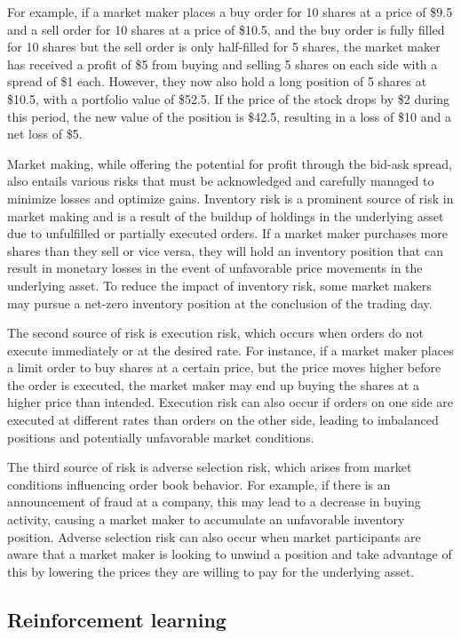 \documentclass[
  12pt,
  a4paper,
  DIV=11,
  numbers=noendperiod]{scrartcl}
\begin{document}
For example, if a market maker places a buy order for 10 shares at a
price of \$9.5 and a sell order for 10 shares at a price of \$10.5, and
the buy order is fully filled for 10 shares but the sell order is only
half-filled for 5 shares, the market maker has received a profit of \$5
from buying and selling 5 shares on each side with a spread of \$1 each.
However, they now also hold a long position of 5 shares at \$10.5, with
a portfolio value of \$52.5. If the price of the stock drops by \$2
during this period, the new value of the position is \$42.5, resulting
in a loss of \$10 and a net loss of \$5.

Market making, while offering the potential for profit through the
bid-ask spread, also entails various risks that must be acknowledged and
carefully managed to minimize losses and optimize gains. Inventory risk
is a prominent source of risk in market making and is a result of the
buildup of holdings in the underlying asset due to unfulfilled or
partially executed orders. If a market maker purchases more shares than
they sell or vice versa, they will hold an inventory position that can
result in monetary losses in the event of unfavorable price movements in
the underlying asset. To reduce the impact of inventory risk, some
market makers may pursue a net-zero inventory position at the conclusion
of the trading day.

The second source of risk is execution risk, which occurs when orders do
not execute immediately or at the desired rate. For instance, if a
market maker places a limit order to buy shares at a certain price, but
the price moves higher before the order is executed, the market maker
may end up buying the shares at a higher price than intended. Execution
risk can also occur if orders on one side are executed at different
rates than orders on the other side, leading to imbalanced positions and
potentially unfavorable market conditions.

The third source of risk is adverse selection risk, which arises from
market conditions influencing order book behavior. For example, if there
is an announcement of fraud at a company, this may lead to a decrease in
buying activity, causing a market maker to accumulate an unfavorable
inventory position. Adverse selection risk can also occur when market
participants are aware that a market maker is looking to unwind a
position and take advantage of this by lowering the prices they are
willing to pay for the underlying asset.

\hypertarget{reinforcement-learning}{%
\subsection{Reinforcement learning}\label{reinforcement-learning}}
\end{document}
